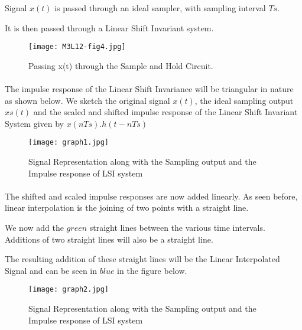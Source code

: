 Signal $x(t)$ is passed through an ideal sampler, with sampling interval $Ts$.

It is then passed through a Linear Shift Invariant system.

\begin{figure}[h]
\centering
\texttt{[image: M3L12-fig4.jpg]}
\caption{Passing x(t) through the Sample and Hold Circuit.}
\end{figure}
\label{sec:example}
\paragraph{}
\paragraph{}
The impulse response of the Linear Shift Invariance will be triangular in nature as shown below. 
We sketch the original signal $x(t)$, the ideal sampling output $xs(t)$ and the scaled and shifted impulse response of the Linear Shift Invariant System given by $x(nTs).h(t-nTs)$

\begin{figure}[h]
\centering
\texttt{[image: graph1.jpg]}
\caption{Signal Representation along with the Sampling output and the Impulse response of LSI system}
\end{figure}

\paragraph{}
\paragraph{}
The shifted and scaled impulse responses are now added linearly. As seen before, linear interpolation is the joining of two points with a straight line.

We now add the $green$ straight lines between the various time intervals. Additions of two straight lines will also be a straight line. 

The resulting addition of these straight lines will be the Linear Interpolated Signal and can be seen in $blue$ in the figure below.
\pagebreak

\begin{figure}[h]
\centering
\texttt{[image: graph2.jpg]}
\caption{Signal Representation along with the Sampling output and the Impulse response of LSI system}
\end{figure}
